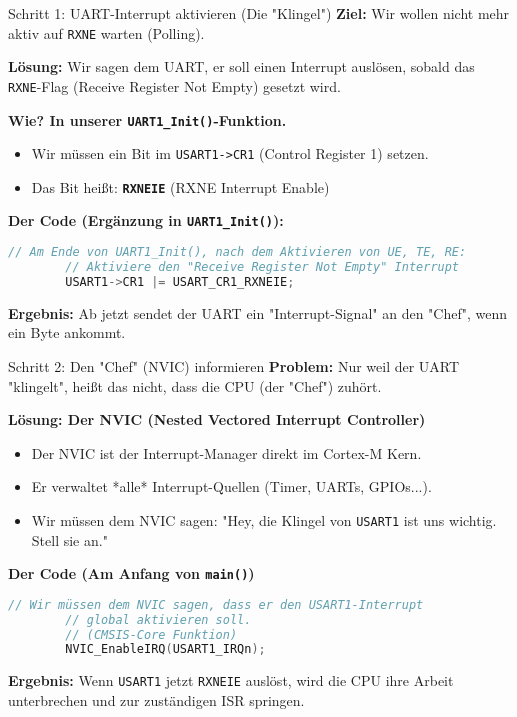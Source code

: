 \documentclass{beamer}
\begin{document}
\begin{frame}[fragile]{Schritt 1: UART-Interrupt aktivieren (Die "Klingel")}
	\textbf{Ziel:} Wir wollen nicht mehr aktiv auf \texttt{RXNE} warten (Polling).
	
	\medskip
	\textbf{Lösung:} Wir sagen dem UART, er soll einen Interrupt auslösen, sobald das \texttt{RXNE}-Flag (Receive Register Not Empty) gesetzt wird.
	
	\bigskip
	\textbf{Wie? In unserer \texttt{UART1\_Init()}-Funktion.}
	\begin{itemize}
		\item Wir müssen ein Bit im \texttt{USART1->CR1} (Control Register 1) setzen.
		\item Das Bit heißt: \textbf{\texttt{RXNEIE}} (RXNE Interrupt Enable)
	\end{itemize}
	
	\bigskip
	\textbf{Der Code (Ergänzung in \texttt{UART1\_Init()}):}
	\begin{lstlisting}[language=C, style=mystyle]
		// Am Ende von UART1_Init(), nach dem Aktivieren von UE, TE, RE:
		// Aktiviere den "Receive Register Not Empty" Interrupt
		USART1->CR1 |= USART_CR1_RXNEIE;
	\end{lstlisting}
	
	\medskip
	\textbf{Ergebnis:} Ab jetzt sendet der UART ein "Interrupt-Signal" an den "Chef", wenn ein Byte ankommt.
\end{frame}

\begin{frame}[fragile]{Schritt 2: Den "Chef" (NVIC) informieren}
	\textbf{Problem:} Nur weil der UART "klingelt", heißt das nicht, dass die CPU (der "Chef") zuhört.
	
	\medskip
	\textbf{Lösung: Der NVIC (Nested Vectored Interrupt Controller)}
	\begin{itemize}
		\item Der NVIC ist der Interrupt-Manager direkt im Cortex-M Kern.
		\item Er verwaltet *alle* Interrupt-Quellen (Timer, UARTs, GPIOs...).
		\item Wir müssen dem NVIC sagen: "Hey, die Klingel von \texttt{USART1} ist uns wichtig. Stell sie an."
	\end{itemize}
	
	\bigskip
	\textbf{Der Code (Am Anfang von \texttt{main()})}
	\begin{lstlisting}[language=C, style=mystyle]
		// Wir müssen dem NVIC sagen, dass er den USART1-Interrupt
		// global aktivieren soll.
		// (CMSIS-Core Funktion)
		NVIC_EnableIRQ(USART1_IRQn);
	\end{lstlisting}
	
	\medskip
	\textbf{Ergebnis:} Wenn \texttt{USART1} jetzt \texttt{RXNEIE} auslöst, wird die CPU ihre Arbeit unterbrechen und zur zuständigen ISR springen.
\end{frame}
\end{document}
